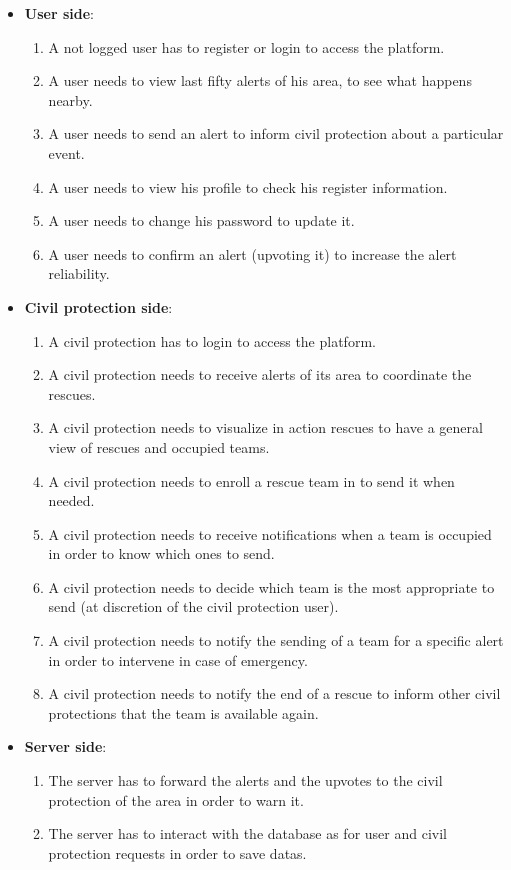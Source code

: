 \documentclass[a4paper,12pt]{report}
\begin{document}
\begin{itemize}
\item \textbf{User side}:
\begin{enumerate}
\item A not logged user has to register or login to access the platform.
\item A user needs to view last fifty alerts of his area, to see what happens nearby.
\item A user needs to send an alert to inform civil protection about a particular event.
\item A user needs to view his profile to check his register information.
\item A user needs to change his password to update it.
\item A user needs to confirm an alert (upvoting it) to increase the alert reliability.
\end{enumerate}
\end{itemize}

\begin{itemize}
\item \textbf{Civil protection side}:
\begin{enumerate}
\item A civil protection has to login to access the platform.
\item A civil protection needs to receive alerts of its area to coordinate the rescues.
\item A civil protection needs to visualize in action rescues to have a general view of rescues and occupied teams.
\item A civil protection needs to enroll a rescue team in to send it when needed.
\item A civil protection needs to receive notifications when a team is occupied in order to know which ones to send.
\item A civil protection needs to decide which team is the most appropriate to send (at discretion of the civil protection user).
\item A civil protection needs to notify the sending of a team for a specific alert in order to intervene in case of emergency.
\item A civil protection needs to notify the end of a rescue to inform other civil protections that the team is available again.
\end{enumerate}
\end{itemize}

\begin{itemize}
\item \textbf{Server side}:
\begin{enumerate}
\item The server has to forward the alerts and the upvotes to the civil protection of the area in order to warn it.
\item The server has to interact with the database as for user and civil protection requests in order to save datas. 
\end{enumerate}
\end{itemize}
\end{document}
